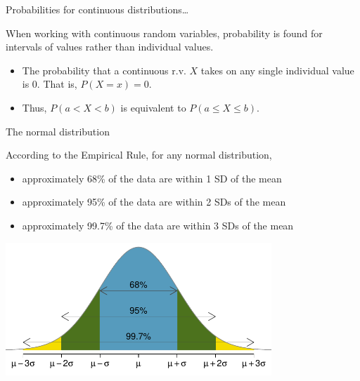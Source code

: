 \documentclass[ignorenonframetext,aspectratio=169]{beamer}
\begin{document}
\begin{frame}{Probabilities for continuous distributions\ldots{}}

When working with continuous random variables, probability is found for
intervals of values rather than individual values.

\begin{itemize}
\item
  The probability that a continuous r.v. \(X\) takes on any single
  individual value is 0. That is, \(P(X = x) = 0\).
\item
  Thus, \(P(a < X < b)\) is equivalent to \(P(a \leq X \leq b)\).
\end{itemize}

\end{frame}

\begin{frame}{The normal distribution}

According to the Empirical Rule, for any normal distribution,

\begin{itemize}
\item
  approximately 68\% of the data are within 1 SD of the mean \medskip 
\item
  approximately 95\% of the data are within 2 SDs of the mean \medskip
\item
  approximately 99.7\% of the data are within 3 SDs of the mean
\end{itemize}

\centering
\includegraphics[width=0.75000\textwidth]{./figures/6895997.pdf}

\end{frame}
\end{document}
